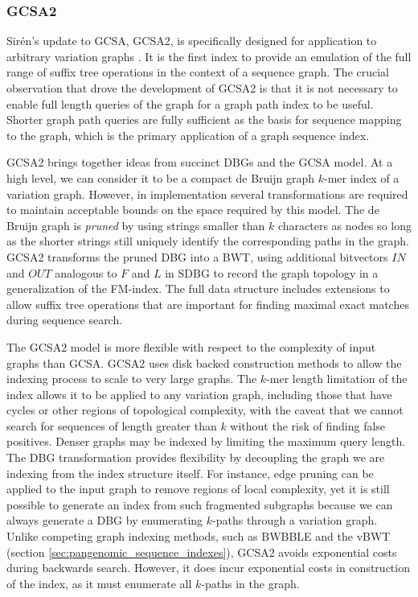 \subsubsection{GCSA2}

Sir\'{e}n's update to GCSA, GCSA2, is specifically designed for application to arbitrary variation graphs \cite{siren2017indexing}.
It is the first index to provide an emulation of the full range of suffix tree operations in the context of a sequence graph.
The crucial observation that drove the development of GCSA2 is that it is not necessary to enable full length queries of the graph for a graph path index to be useful.
Shorter graph path queries are fully sufficient as the basis for sequence mapping to the graph, which is the primary application of a graph sequence index.

GCSA2 brings together ideas from succinct DBGs and the GCSA model.
At a high level, we can consider it to be a compact de Bruijn graph $k$-mer index of a variation graph.
However, in implementation several transformations are required to maintain acceptable bounds on the space required by this model.
The de Bruijn graph is \emph{pruned} by using strings smaller than $k$ characters as nodes so long as the shorter strings still uniquely identify the corresponding paths in the graph.
GCSA2 transforms the pruned DBG into a BWT, using additional bitvectors $IN$ and $OUT$ analogous to $F$ and $L$ in SDBG to record the graph topology in a generalization of the FM-index.
The full data structure includes extensions to allow suffix tree operations that are important for finding maximal exact matches during sequence search.

The GCSA2 model is more flexible with respect to the complexity of input graphs than GCSA.
GCSA2 uses disk backed construction methods to allow the indexing process to scale to very large graphs.
The $k$-mer length limitation of the index allows it to be applied to any variation graph, including those that have cycles or other regions of topological complexity, with the caveat that we cannot search for sequences of length greater than $k$ without the risk of finding false positives.
Denser graphs may be indexed by limiting the maximum query length.
The DBG transformation provides flexibility by decoupling the graph we are indexing from the index structure itself.
For instance, edge pruning can be applied to the input graph to remove regions of local complexity, yet it is still possible to generate an index from such fragmented subgraphs because we can always generate a DBG by enumerating $k$-paths through a variation graph.
Unlike competing graph indexing methods, such as BWBBLE and the vBWT (section \ref{sec:pangenomic_sequence_indexes}), GCSA2 avoids exponential costs during backwards search.
However, it does incur exponential costs in construction of the index, as it must enumerate all $k$-paths in the graph.

